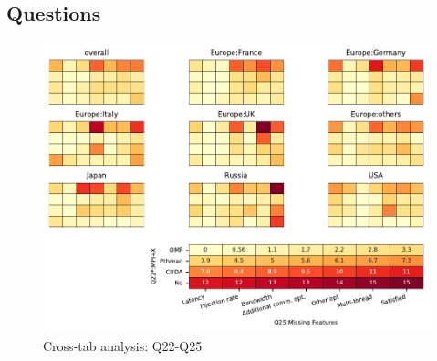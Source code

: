 
\subsection{Questions}


\begin{figure}
\begin{center}
\includegraphics[width=12cm]{../pdfs/Q22-Q25.pdf}
\caption{Cross-tab analysis: Q22-Q25}
\label{fig:Q22-Q25}
\end{center}
\end{figure}
